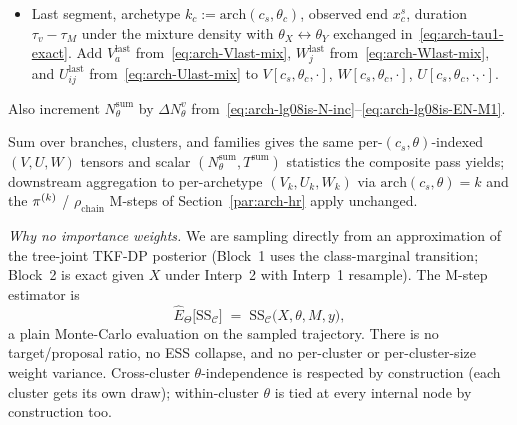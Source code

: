 \begin{itemize}
\begin{itemize}
\begin{align*}
                         {P_\theta(\theta_p \to \theta_c; \tau_v)
                          - \beta(\theta_p)\, \delta_{\theta_p, \theta_c}}, \\
          E[N_{\theta_{\text{int}}} \mid \theta_p, \theta_c, \tau_v, M \geq 1]
            &\;=\; \frac{E[N_{\theta_{\text{int}}} \mid \theta_p, \theta_c, \tau_v]\,
                          P_\theta(\theta_p \to \theta_c; \tau_v)}
                         {P_\theta(\theta_p \to \theta_c; \tau_v)
                          - \beta(\theta_p)\, \delta_{\theta_p, \theta_c}},
        \end{align*}
        from~\eqref{eq:arch-Ntheta-closed}
        and~\eqref{eq:arch-arrivals-closed}. Subtract first- and
        last-segment residuals~\eqref{eq:arch-taumid}--\eqref{eq:arch-Nmid}
        to get $\tau_{\text{mid}}(\theta_{\text{int}})$ and
        $N_{\text{mid}}(\theta_{\text{int}})$, then add
        \eqref{eq:arch-mid-V}--\eqref{eq:arch-mid-U} to
        $V[c_s, \theta_{\text{int}}, \cdot]$, $W[c_s, \theta_{\text{int}},
        \cdot]$, $U[c_s, \theta_{\text{int}}, \cdot, \cdot]$.
      \item Last segment, archetype $k_c := \mathrm{arch}(c_s,
        \theta_c)$, observed end $x_c^s$, duration $\tau_v - \tau_M$
        under the mixture density with $\theta_X \leftrightarrow
        \theta_Y$ exchanged in~\eqref{eq:arch-tau1-exact}. Add
        $V^{\text{last}}_a$ from~\eqref{eq:arch-Vlast-mix},
        $W^{\text{last}}_j$ from~\eqref{eq:arch-Wlast-mix}, and
        $U^{\text{last}}_{ij}$ from~\eqref{eq:arch-Ulast-mix} to
        $V[c_s, \theta_c, \cdot]$, $W[c_s, \theta_c, \cdot]$,
        $U[c_s, \theta_c, \cdot, \cdot]$.
    \end{itemize}
    Also increment $N_\theta^{\mathrm{sum}}$ by $\Delta N_\theta^v$
    from~\eqref{eq:arch-lg08is-N-inc}--\eqref{eq:arch-lg08is-EN-M1}.
\end{itemize}
Sum over branches, clusters, and families gives the same per-$(c_s,
\theta)$-indexed $(V, U, W)$ tensors and scalar
$(N_\theta^{\mathrm{sum}}, T^{\mathrm{sum}})$ statistics the composite
pass yields; downstream aggregation to per-archetype $(V_k, U_k, W_k)$
via $\mathrm{arch}(c_s, \theta) = k$ and the $\pi^{(k)}$ /
$\rho_{\mathrm{chain}}$ M-steps of Section~\ref{par:arch-hr} apply
unchanged.

\emph{Why no importance weights.} We are sampling directly from an
approximation of the tree-joint TKF-DP posterior (Block~1 uses the
class-marginal transition; Block~2 is exact given $X$ under Interp~2
with Interp~1 resample). The M-step estimator is
\begin{equation}
  \widehat{E}_\Theta\!\bigl[\mathrm{SS}_\mathcal{C}\bigr]
    \;=\; \mathrm{SS}_\mathcal{C}\!\bigl(X, \theta, M, y\bigr),
  \label{eq:arch-lg08is-SS-tied}
\end{equation}
a plain Monte-Carlo evaluation on the sampled trajectory. There is no
target/proposal ratio, no ESS collapse, and no per-cluster or
per-cluster-size weight variance. Cross-cluster $\theta$-independence
is respected by construction (each cluster gets its own draw);
within-cluster $\theta$ is tied at every internal node by construction
too.

